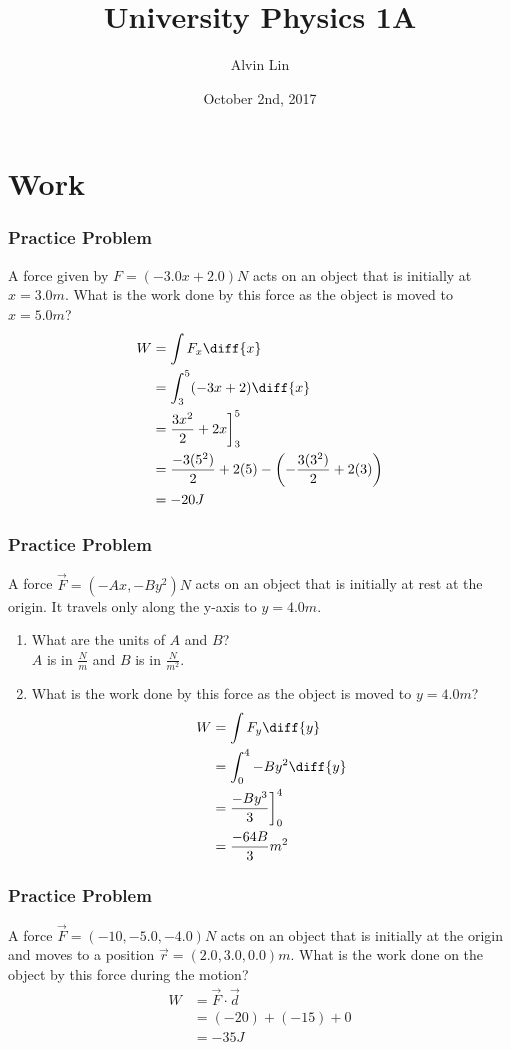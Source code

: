 \documentclass{math}
\title{University Physics 1A}
\author{Alvin Lin}
\date{October 2nd, 2017}
\begin{document}
\maketitle

\section*{Work}

\subsubsection*{Practice Problem}
A force given by \( F = (-3.0x+2.0)N \) acts on an object that is initially at
\( x = 3.0m \). What is the work done by this force as the object is moved to
\( x = 5.0m \)?
\begin{align*}
  W &= \int{F_x\diff{x}} \\
  &= \int_{3}^{5}(-3x+2)\diff{x} \\
  &= \frac{3x^2}{2}+2x\bigg]_3^5 \\
  &= \frac{-3(5^2)}{2}+2(5)-\left(-\frac{3(3^2)}{2}+2(3)\right) \\
  &= -20J
\end{align*}

\subsubsection*{Practice Problem}
A force \( \vec{F} = (-Ax,-By^2)N \) acts on an object that is initially at rest
at the origin. It travels only along the y-axis to \( y = 4.0m \).
\begin{enumerate}
  \item What are the units of \( A \) and \( B \)? \\
  \( A \) is in \( \frac{N}{m} \) and \( B \) is in \( \frac{N}{m^2} \).
  \item What is the work done by this force as the object is moved to
  \( y = 4.0m \)?
  \begin{align*}
    W &= \int{F_y\diff{y}} \\
    &= \int_{0}^{4}-By^2\diff{y} \\
    &= \frac{-By^3}{3}\bigg]_{0}^{4} \\
    &= \frac{-64B}{3}m^2
  \end{align*}
\end{enumerate}

\subsubsection*{Practice Problem}
A force \( \vec{F} = (-10,-5.0,-4.0)N \) acts on an object that is initially at
the origin and moves to a position \( \vec{r} = (2.0,3.0,0.0)m \). What is the
work done on the object by this force during the motion?
\begin{align*}
  W &= \vec{F}\cdot\vec{d} \\
  &= (-20)+(-15)+0 \\
  &= -35J
\end{align*}
\end{document}
